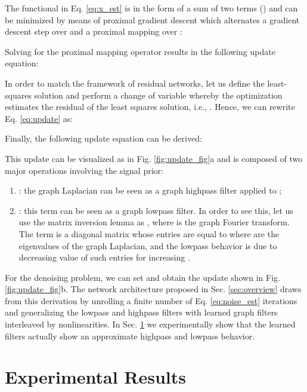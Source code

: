 \documentclass[journal]{IEEEtran}
\begin{document}
The functional in Eq. \eqref{eq:x_est} is in the form of a sum of two terms () and can be minimized by means of proximal gradient descent \cite{combettes2011proximal} which alternates a gradient descent step over  and a proximal mapping over :

Solving for the proximal mapping operator results in the following update equation:

In order to match the framework of residual networks, let us define the least-squares solution  and perform a change of variable whereby the optimization estimates the residual of the least squares solution, i.e., . Hence, we can rewrite Eq. \eqref{eq:update} as:

Finally, the following update equation can be derived:




This update can be visualized as in Fig. \ref{fig:update_fig}a and is composed of two major operations involving the signal prior:
\begin{enumerate}
    \item : the graph Laplacian can be seen as a graph highpass filter applied to ;
    \item : this term can be seen as a graph lowpass filter. In order to see this, let us use the matrix inversion lemma as , where  is the graph Fourier transform. The term  is a diagonal matrix whose entries are equal to  where  are the eigenvalues of the graph Laplacian, and the lowpass behavior is due to decreasing value of such entries for increasing .
\end{enumerate}
For the denoising problem, we can set  and obtain the update shown in Fig.\ref{fig:update_fig}b.
The network architecture proposed in Sec. \ref{sec:overview} draws from this derivation by unrolling a finite number of Eq. \eqref{eq:noise_est} iterations and generalizing the lowpass and highpass filters with learned graph filters interleaved by nonlinearities. In Sec. \ref{sec:experiments} we experimentally show that the learned filters actually show an approximate highpass and lowpass behavior.


\section{Experimental Results} \label{sec:experiments}
\end{document}
